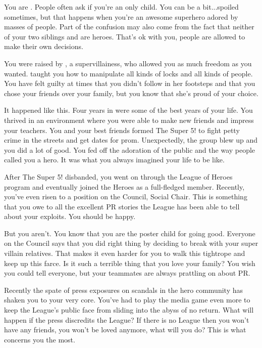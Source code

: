 \documentclass[char]{LRSguildcamp1}
\begin{document}
\name{\cYoungest{}}

You are \cYoungest {\intro}. People often ask if you're an only child. You can be a bit...spoiled sometimes, but that happens when you're an awesome superhero adored by masses of people. Part of the confusion may also come from the fact that neither of your two siblings \cOldest{} and \cArchitect{} are heroes. That's ok with you, people are allowed to make their own decisions.  

You were raised by \cGrandma{\Mysupername}, a supervillainess, who allowed you as much freedom as you wanted. \cGrandma{} taught you how to manipulate all kinds of locks and all kinds of people. You have felt guilty at times that you didn't follow in her footsteps and that you chose your friends over your family, but you know that she's proud of your choice. 

It happened like this. Four years in \pSuperSchool{} were some of the best years of your life. You thrived in an environment where you were able to make new friends and impress your teachers. You and your best friends formed The Super 5! to fight petty crime in the streets and get dates for prom. Unexpectedly, the group blew up and you did a lot of good. You fed off the adoration of the public and the way people called you a hero. It was what you always imagined your life to be like.  
 
After The Super 5! disbanded, you went on through the League of Heroes program and eventually joined the Heroes as a full-fledged member. Recently, you've even risen to a position on the Council, Social Chair. This is something that you owe to all the excellent PR stories the League has been able to tell about your exploits. You should be happy. 

But you aren't. You know that you are the poster child for going good. Everyone on the Council says that you did right thing by deciding to break with your super villain relatives. That makes it even harder for you to walk this tightrope and keep up this farce. Is it such a terrible thing that you love your family? 
You wish you could tell everyone, but your teammates are always prattling on about PR. 

Recently the spate of press exposures on scandals in the hero community has shaken you to your very core. You've had to play the media game even more to keep the League's public face from sliding into the abyss of no return. What will happen if the press discredits the League? If there is no League then you won't have any friends, you won't be loved anymore, what will you do? This is what concerns you the most. 
\end{document}
